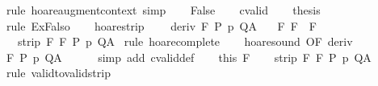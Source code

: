 \begin{isabellebody}
\ {\isacharparenleft}rule\ hoare{\isacharunderscore}augment{\isacharunderscore}context{\isacharparenright}\ simp\isanewline
{}\isamarkupfalse%
\isanewline
\ \ \isamarkupfalse%
\ False\isanewline
\ \ \isamarkupfalse%
\ cvalid\isanewline
\ \ \isamarkupfalse%
\ {\isacharquery}thesis\isanewline
\ \ \ \ \isamarkupfalse%
\ {\isacharparenleft}rule\ ExFalso{\isacharparenright}\isanewline
{}\isamarkupfalse%
%
\endisatagproof
{\isafoldproof}%
%
\isadelimproof
\isanewline
%
\endisadelimproof
\ \ \isanewline
\isanewline
{}\isamarkupfalse%
\ hoare{\isacharunderscore}strip{\isacharunderscore}{\isasymGamma}{\isacharcolon}\ \isanewline
\ \ \ deriv{\isacharcolon}\ {\isachardoublequoteopen}{\isasymGamma}{\isacharcomma}{\isacharbraceleft}{\isacharbraceright}{\isasymturnstile}\isactrlbsub {\isacharslash}F\isactrlesub \ P\ p\ Q{\isacharcomma}A{\isachardoublequoteclose}\isanewline
\ \ \ F{\isacharprime}{\isacharcolon}\ {\isachardoublequoteopen}F{\isacharprime}\ {\isasymsubseteq}\ {\isacharminus}F{\isachardoublequoteclose}\isanewline
\ \ \ {\isachardoublequoteopen}strip\ F{\isacharprime}\ {\isasymGamma}{\isacharcomma}{\isacharbraceleft}{\isacharbraceright}{\isasymturnstile}\isactrlbsub {\isacharslash}F\isactrlesub \ P\ p\ Q{\isacharcomma}A{\isachardoublequoteclose}\isanewline
%
\isadelimproof
%
\endisadelimproof
%
\isatagproof
{}\isamarkupfalse%
\ {\isacharparenleft}rule\ hoare{\isacharunderscore}complete{\isacharparenright}\isanewline
\ \ \isamarkupfalse%
\ hoare{\isacharunderscore}sound\ {\isacharbrackleft}OF\ deriv{\isacharbrackright}\ \isamarkupfalse%
\ {\isachardoublequoteopen}{\isasymGamma}{\isasymTurnstile}\isactrlbsub {\isacharslash}F\isactrlesub \ P\ p\ Q{\isacharcomma}A{\isachardoublequoteclose}\isanewline
\ \ \ \ \isamarkupfalse%
\ {\isacharparenleft}simp\ add{\isacharcolon}\ cvalid{\isacharunderscore}def{\isacharparenright}\isanewline
\ \ \isamarkupfalse%
\ this\ F{\isacharprime}\isanewline
\ \ \isamarkupfalse%
\ {\isachardoublequoteopen}strip\ F{\isacharprime}\ {\isasymGamma}{\isasymTurnstile}\isactrlbsub {\isacharslash}F\isactrlesub \ P\ p\ Q{\isacharcomma}A{\isachardoublequoteclose}\isanewline
\ \ \ \ \isamarkupfalse%
\ {\isacharparenleft}rule\ valid{\isacharunderscore}to{\isacharunderscore}valid{\isacharunderscore}strip{\isacharparenright}\isanewline
{}\isamarkupfalse%

\end{isabellebody}
